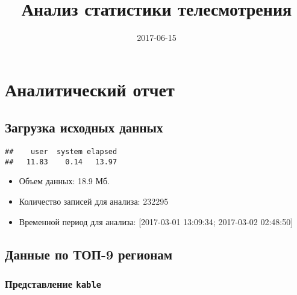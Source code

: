 \documentclass[12pt,]{article}
\title{Анализ статистики телесмотрения}
\author{}
\date{2017-06-15}
\providecommand{\tightlist}{%
  \setlength{\itemsep}{0pt}\setlength{\parskip}{0pt}}
\begin{document}
\maketitle

\section{Аналитический отчет}\label{-}

\subsection{Загрузка исходных данных}\label{--}

\begin{verbatim}
##    user  system elapsed 
##   11.83    0.14   13.97
\end{verbatim}

\begin{itemize}
\tightlist
\item
  Объем данных: 18.9 Мб.
\item
  Количество записей для анализа: 232295
\item
  Временной период для анализа: {[}2017-03-01 13:09:34; 2017-03-02
  02:48:50{]}
\end{itemize}

\subsection{Данные по ТОП-9 регионам}\label{---9-}

\subsubsection{\texorpdfstring{Представление
\texttt{kable}}{Представление kable}}\label{-kable}
\end{document}
